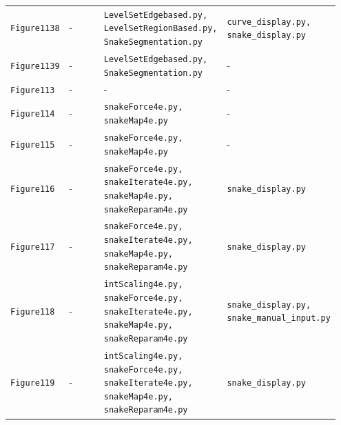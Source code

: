 \documentclass[10pt]{article}
\begin{document}
\begin{longtable}{p{0.11\linewidth} p{0.28\linewidth} p{0.28\linewidth} p{0.28\linewidth}}
\texttt{Figure1138} & - & \texttt{LevelSetEdgebased.py, LevelSetRegionBased.py, SnakeSegmentation.py} & \texttt{curve\_display.py, snake\_display.py} \\
\texttt{Figure1139} & - & \texttt{LevelSetEdgebased.py, SnakeSegmentation.py} & - \\
\texttt{Figure113} & - & - & - \\
\texttt{Figure114} & - & \texttt{snakeForce4e.py, snakeMap4e.py} & - \\
\texttt{Figure115} & - & \texttt{snakeForce4e.py, snakeMap4e.py} & - \\
\texttt{Figure116} & - & \texttt{snakeForce4e.py, snakeIterate4e.py, snakeMap4e.py, snakeReparam4e.py} & \texttt{snake\_display.py} \\
\texttt{Figure117} & - & \texttt{snakeForce4e.py, snakeIterate4e.py, snakeMap4e.py, snakeReparam4e.py} & \texttt{snake\_display.py} \\
\texttt{Figure118} & - & \texttt{intScaling4e.py, snakeForce4e.py, snakeIterate4e.py, snakeMap4e.py, snakeReparam4e.py} & \texttt{snake\_display.py, snake\_manual\_input.py} \\
\texttt{Figure119} & - & \texttt{intScaling4e.py, snakeForce4e.py, snakeIterate4e.py, snakeMap4e.py, snakeReparam4e.py} & \texttt{snake\_display.py} \\
\end{longtable}
\end{document}
